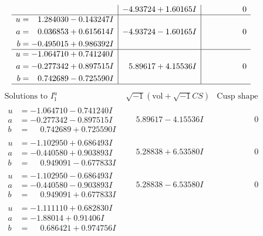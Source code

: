 \documentclass[1p]{elsarticle_modified}
\theoremstyle{definition}
\newcommand{\I}{\sqrt{-1}}
\begin{document}
$$\begin{array}{c|c|c}
 & -4.93724 + 1.60165 I & \phantom{-0.000000 } 0 \\ \hline\begin{aligned}
u &= \phantom{-}1.284030 - 0.143247 I \\
a &= \phantom{-}0.036853 + 0.615614 I \\
b &= -0.495015 + 0.986392 I\end{aligned}
 & -4.93724 - 1.60165 I & \phantom{-0.000000 } 0 \\ \hline\begin{aligned}
u &= -1.064710 + 0.741240 I \\
a &= -0.277342 + 0.897515 I \\
b &= \phantom{-}0.742689 - 0.725590 I\end{aligned}
 & \phantom{-}5.89617 + 4.15536 I & \phantom{-0.000000 } 0\\
 \hline 
 \end{array}$$\newpage$$\begin{array}{c|c|c}  
\text{Solutions to }I^u_{1}& \I (\text{vol} + \sqrt{-1}CS) & \text{Cusp shape}\\
 \hline 
\begin{aligned}
u &= -1.064710 - 0.741240 I \\
a &= -0.277342 - 0.897515 I \\
b &= \phantom{-}0.742689 + 0.725590 I\end{aligned}
 & \phantom{-}5.89617 - 4.15536 I & \phantom{-0.000000 } 0 \\ \hline\begin{aligned}
u &= -1.102950 + 0.686493 I \\
a &= -0.440580 + 0.903893 I \\
b &= \phantom{-}0.949091 - 0.677833 I\end{aligned}
 & \phantom{-}5.28838 + 6.53580 I & \phantom{-0.000000 } 0 \\ \hline\begin{aligned}
u &= -1.102950 - 0.686493 I \\
a &= -0.440580 - 0.903893 I \\
b &= \phantom{-}0.949091 + 0.677833 I\end{aligned}
 & \phantom{-}5.28838 - 6.53580 I & \phantom{-0.000000 } 0 \\ \hline\begin{aligned}
u &= -1.111110 + 0.682830 I \\
a &= -1.88014 + 0.91406 I \\
b &= \phantom{-}0.686421 + 0.974756 I\end{aligned}

\end{array}$$
\end{document}
